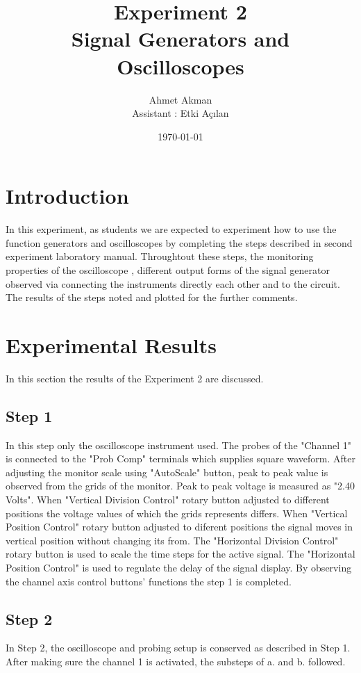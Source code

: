 \documentclass[letterpaper,12pt]{article}
\begin{document}
\title{Experiment 2 \protect\\Signal Generators and Oscilloscopes}
\author{Ahmet Akman \protect\\ Assistant : Etki Açılan}
\date{\today}
\maketitle



\section{Introduction} 
In this experiment, as students we are expected to experiment how to use the function generators and oscilloscopes by completing the steps described in second experiment laboratory manual. Throughtout these steps, the monitoring properties of the oscilloscope , different output forms of the signal generator observed via connecting the instruments directly each other and to the circuit. The results of the steps noted and plotted for the further comments.
\section{Experimental Results}
In this section the results of the Experiment 2 are discussed.
\subsection{Step 1}
In this step only the oscilloscope instrument used. The probes of the "Channel 1" is connected to the "Prob Comp" terminals which supplies square waveform. After adjusting the monitor scale using "AutoScale" button, peak to peak value is observed from the grids of the monitor. Peak to peak voltage is measured as "2.40 Volts". When "Vertical Division Control" rotary button adjusted to different positions the voltage values of which the grids represents differs. When "Vertical Position Control" rotary button adjusted to diferent positions the signal moves in vertical position without changing its from. The "Horizontal Division Control" rotary button is used to scale the time steps for the active signal. The "Horizontal Position Control" is used to regulate the delay of the signal display. By observing the channel axis control buttons' functions the step 1 is completed.
\subsection{Step 2}
In Step 2, the oscilloscope and probing setup is conserved as described in Step 1. After making sure the channel 1 is activated, the substeps of a. and b. followed.
\end{document}
